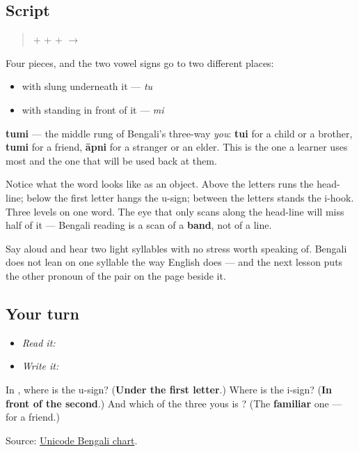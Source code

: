 \subsection*{Script}
\begin{quote}
\textbf{} + \textbf{} + \textbf{} + \textbf{} $\to$ \textbf{}
\end{quote}

Four pieces, and the two vowel signs go to two different places:

\begin{itemize}
\raggedright
  \item \textbf{} with \textbf{} slung underneath it — \emph{tu}
  \item \textbf{} with \textbf{} standing in front of it — \emph{mi}
\end{itemize}

\textbf{tumi} — the middle rung of Bengali's three-way \emph{you}: \textbf{tui} for a child or a brother, \textbf{tumi} for a friend, \textbf{āpni} for a stranger or an elder. This is the one a learner uses most and the one that will be used back at them.

Notice what the word looks like as an object. Above the letters runs the head-line; below the first letter hangs the u-sign; between the letters stands the i-hook. Three levels on one word. The eye that only scans along the head-line will miss half of it — Bengali reading is a scan of a \textbf{band}, not of a line.

Say \textbf{} aloud and hear two light syllables with no stress worth speaking of. Bengali does not lean on one syllable the way English does — and the next lesson puts the other pronoun of the pair on the page beside it.

\subsection*{Your turn}
\begin{itemize}
\raggedright
  \item \emph{Read it:} 
  \item \emph{Write it:} 
\end{itemize}

\begin{tcolorbox}[breakable,colback=teal!4,colframe=teal!35!black,title={Before you move on}]
In \textbf{}, where is the u-sign? (\textbf{Under the first letter}.) Where is the i-sign? (\textbf{In front of the second}.) And which of the three yous is \textbf{}? (The \textbf{familiar} one — for a friend.)

Source: \href{https://www.unicode.org/charts/PDF/U0980.pdf}{Unicode Bengali chart}.
\end{tcolorbox}
